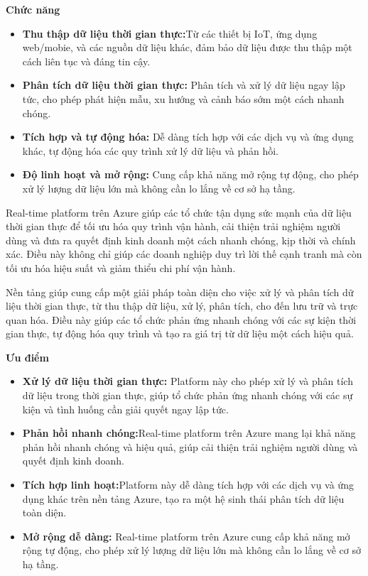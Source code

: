 \textbf{Chức năng}
\begin{itemize}
    \item \textbf{Thu thập dữ liệu thời gian thực:}Từ các thiết bị IoT, ứng dụng web/mobie, và các nguồn dữ liệu khác, đảm bảo dữ liệu được thu thập một cách liên tục và đáng tin cậy.
    \item \textbf{Phân tích dữ liệu thời gian thực:} Phân tích và xử lý dữ liệu ngay lập tức, cho phép phát hiện mẫu, xu hướng và cảnh báo sớm một cách nhanh chóng.
    \item \textbf{Tích hợp và tự động hóa:}  Dễ dàng tích hợp với các dịch vụ và ứng dụng khác, tự động hóa các quy trình xử lý dữ liệu và phản hồi.
    \item \textbf{Độ linh hoạt và mở rộng:} Cung cấp khả năng mở rộng tự động, cho phép xử lý lượng dữ liệu lớn mà không cần lo lắng về cơ sở hạ tầng.

\end{itemize}

Real-time platform trên Azure giúp các tổ chức tận dụng sức mạnh của dữ liệu thời gian thực để tối ưu hóa quy trình vận hành, cải thiện trải nghiệm người dùng và đưa ra quyết định kinh doanh một cách nhanh chóng, kịp thời và chính xác. 
Điều này không chỉ giúp các doanh nghiệp duy trì lời thế cạnh tranh mà còn tối ưu hóa hiệu suất và giảm thiểu chi phí vận hành.

Nền tảng giúp cung cấp một giải pháp toàn diện cho việc xử lý và phân tích dữ liệu thời gian thực, từ thu thập dữ liệu, xử lý, phân tích, cho đến lưu trữ và trực quan hóa. Điều này giúp các tổ chức phản ứng nhanh chóng với các sự kiện thời gian thực, tự động hóa quy trình và
tạo ra giá trị từ dữ liệu một cách hiệu quả.

\textbf{Ưu điểm}
\begin{itemize}
    \item  \textbf{Xử lý dữ liệu thời gian thực:} Platform này cho phép xử lý và phân tích dữ liệu trong thời gian thực, giúp tổ chức phản ứng nhanh chóng với các sự kiện và tình huống cần giải quyết ngay lập tức.
    \item \textbf{Phản hồi nhanh chóng:}Real-time platform trên Azure mang lại khả năng phản hồi nhanh chóng và hiệu quả, giúp cải thiện trải nghiệm người dùng và quyết định kinh doanh.
    \item \textbf{Tích hợp linh hoạt:}Platform này dễ dàng tích hợp với các dịch vụ và ứng dụng khác trên nền tảng Azure, tạo ra một hệ sinh thái phân tích dữ liệu toàn diện.
    \item \textbf{Mở rộng dễ dàng:} Real-time platform trên Azure cung cấp khả năng mở rộng tự động, cho phép xử lý lượng dữ liệu lớn mà không cần lo lắng về cơ sở hạ tầng.
    
\end{itemize}

